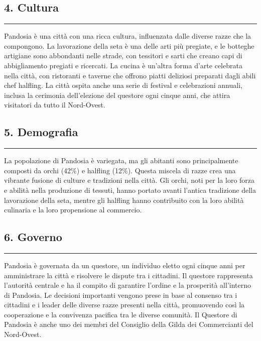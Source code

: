 \subsection{4. Cultura}\label{cultura}

\begin{center}\rule{0.5\linewidth}{0.5pt}\end{center}

Pandosia è una città con una ricca cultura, influenzata dalle diverse
razze che la compongono. La lavorazione della seta è una delle arti più
pregiate, e le botteghe artigiane sono abbondanti nelle strade, con
tessitori e sarti che creano capi di abbigliamento pregiati e ricercati.
La cucina è un'altra forma d'arte celebrata nella città, con ristoranti
e taverne che offrono piatti deliziosi preparati dagli abili chef
halfling. La città ospita anche una serie di festival e celebrazioni
annuali, inclusa la cerimonia dell'elezione del questore ogni cinque
anni, che attira visitatori da tutto il Nord-Ovest.

\subsection{5. Demografia}\label{demografia}

\begin{center}\rule{0.5\linewidth}{0.5pt}\end{center}

La popolazione di Pandosia è variegata, ma gli abitanti sono
principalmente composti da orchi (42\%) e halfling (12\%). Questa
miscela di razze crea una vibrante fusione di culture e tradizioni nella
città. Gli orchi, noti per la loro forza e abilità nella produzione di
tessuti, hanno portato avanti l'antica tradizione della lavorazione
della seta, mentre gli halfling hanno contribuito con la loro abilità
culinaria e la loro propensione al commercio.

\subsection{6. Governo}\label{governo}

\begin{center}\rule{0.5\linewidth}{0.5pt}\end{center}

Pandosia è governata da un questore, un individuo eletto ogni cinque
anni per amministrare la città e risolvere le dispute tra i cittadini.
Il questore rappresenta l'autorità centrale e ha il compito di garantire
l'ordine e la prosperità all'interno di Pandosia. Le decisioni
importanti vengono prese in base al consenso tra i cittadini e i leader
delle diverse razze presenti nella città, promuovendo così la
cooperazione e la convivenza pacifica tra le diverse comunità. Il
Questore di Pandosia è anche uno dei membri del Consiglio della Gilda
dei Commercianti del Nord-Ovest.
